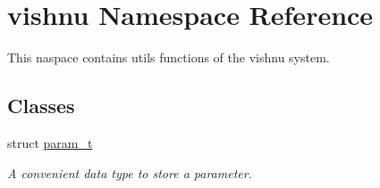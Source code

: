 \hypertarget{namespacevishnu}{
\section{vishnu Namespace Reference}
\label{namespacevishnu}
}


This naspace contains utils functions of the vishnu system.  


\subsection*{Classes}
\begin{DoxyCompactItemize}
\item 
struct \hyperlink{structvishnu_1_1param__t}{param\_\-t}
\begin{DoxyCompactList}\small\item\em A convenient data type to store a parameter. \item\end{DoxyCompactList}\end{DoxyCompactItemize}
